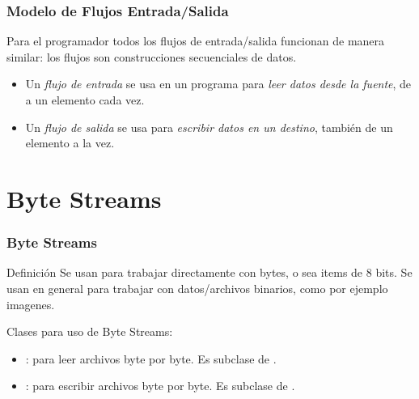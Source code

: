 \documentclass{beamer}
\begin{document}
\begin{frame}
  \frametitle{Modelo de Flujos Entrada/Salida}

  Para el programador todos los flujos de entrada/salida funcionan de
  manera similar: los flujos son construcciones secuenciales de datos.

  \begin{itemize}
  \item Un \emph{flujo de entrada} se usa en un programa para
    \emph{leer datos desde la fuente}, de a un elemento cada vez.

  \item Un \emph{flujo de salida} se usa para \emph{escribir datos en
      un destino}, también de un elemento a la vez.
  \end{itemize}

\end{frame}

\section{Byte Streams}

\begin{frame}
  \frametitle{Byte Streams}

  \begin{block}{Definición}
    Se usan para trabajar directamente con bytes, o sea items de 8
    bits. Se usan en general para trabajar con datos/archivos
    binarios, como por ejemplo imagenes.
  \end{block}

  Clases para uso de Byte Streams:

  \begin{itemize}

  \item {}: para leer archivos byte por
    byte. Es subclase de .

  \item {}: para escribir archivos byte
    por byte. Es subclase de .

  \end{itemize}

\end{frame}
\end{document}
